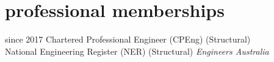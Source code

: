 \documentclass[print]{friggeri}
\begin{document}



\section{professional memberships}
\begin{entrylist}
\entry%
{since 2017}
{Chartered Professional Engineer {\normalfont (CPEng) (Structural)}\\
National Engineering Register {\normalfont (NER) (Structural)}}%
{}
{\emph{Engineers Australia}
}
\end{entrylist}

\end{document}

